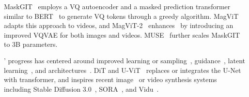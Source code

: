  MaskGIT~\cite{maskgit} employs a VQ autoencoder and a masked prediction transformer similar to BERT~\cite{bert, beit, mae} to generate VQ tokens through a greedy algorithm.
MagViT~\cite{magvit} adapts this approach to videos, and MagViT-2~\cite{magvit2} enhances~\cite{maskgit,magvit} by introducing an improved VQVAE for both images and videos.
MUSE~\cite{muse} further scales MaskGIT to 3B parameters.

' progress has centered around improved learning or sampling~\cite{scorebased,ddim, dpm-solver,dpmpp,bao2022analytic}, guidance~\cite{cfg, glide}, latent learning~\cite{ldm}, and architectures~\cite{cdm, dit, imagen, raphael}.
DiT and U-ViT~\cite{dit,bao2023all} replaces or integrates the U-Net with transformer, and inspires recent image~\cite{chen2023pixart,chen2024pixart_sigma} or video synthesis systems~\cite{bar2024lumiere,gupta2023photorealistic} including Stable Diffusion 3.0~\cite{stable-diffusion3}, SORA~\cite{sora}, and Vidu~\cite{bao2024vidu}.
